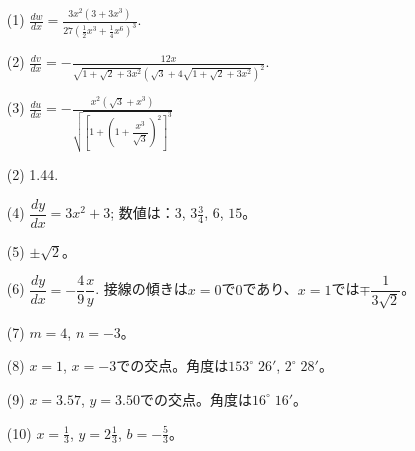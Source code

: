\documentclass[a4paper,11pt,openany]{ltjsbook}
\begin{document}
\begin{enumerate}
\item[(1)]  \(\frac{dw}{dx} = \frac{3x^2 \left( 3 + 3x^3 \right)} {27 \left(\frac{1}{2} x^3 + \frac{1}{4} x^6 \right)^3}\).

\item[(2)]  \(\frac{dv}{dx} = - \frac{12x}{\sqrt{1 + \sqrt{2} + 3x^2} \left(\sqrt{3} + 4 \sqrt{1 + \sqrt{2} + 3x^2}\right)^2}\).

\item[(3)]  \(\frac{du}{dx} = - \frac{x^2 \left(\sqrt{3} + x^3 \right)} {\sqrt{ \left[ 1 + \left( 1 + \dfrac{x^3}{\sqrt{3}} \right) ^2 \right]^3}} \)
\par\smallskip

\end{enumerate}
\par\bigskip{}\par\smallskip

\begin{enumerate}
\item[(2)] 1.44.
\par\smallskip

\item[(4)] $\dfrac{dy}{dx} = 3x^2 + 3$; 数値は：$3$, $3 \frac{3}{4}$, $6$, $15$。

\item[(5)] $± \sqrt{2}$。

\item[(6)] $\dfrac{dy}{dx} = - \dfrac{4}{9} \dfrac{x}{y}$. 接線の傾きは$x = 0$で$0$であり、$x = 1$では$\mp \dfrac{1}{3 \sqrt{2}}$。

\item[(7)] $m = 4$, $n = -3$。

\item[(8)] $x = 1$, $x = -3$での交点。角度は$153^\circ\;26'$, $2^\circ\;28'$。

\item[(9)] $x = 3.57$, $y = 3.50$での交点。角度は$16^\circ\;16'$。

\item[(10)] $x = \frac{1}{3}$, $y = 2 \frac{1}{3}$, $b = -\frac{5}{3}$。
\par\smallskip

\end{enumerate}
\par\bigskip\noindent{\Large\bfseries [演習 IX の解答]}\par\smallskip
\end{document}

